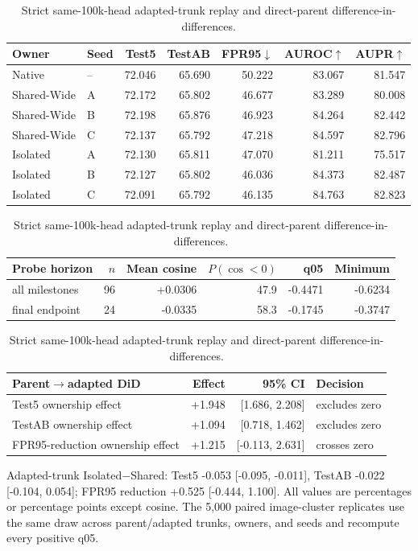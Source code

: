 \begin{table}[t]
\centering
\caption{Strict same-100k-head adapted-trunk replay and direct-parent difference-in-differences.}
\label{tab:supp-same-head-stage-axis}
\scriptsize
\setlength{\tabcolsep}{3.2pt}
\begin{tabular}{llrrrrr}
\toprule
Owner & Seed & Test5 & TestAB & FPR95$\downarrow$ & AUROC$\uparrow$ & AUPR$\uparrow$\\
\midrule
Native & -- & 72.046 & 65.690 & 50.222 & 83.067 & 81.547 \\
Shared-Wide & A & 72.172 & 65.802 & 46.677 & 83.289 & 80.008 \\
Shared-Wide & B & 72.198 & 65.876 & 46.923 & 84.264 & 82.442 \\
Shared-Wide & C & 72.137 & 65.792 & 47.218 & 84.597 & 82.796 \\
Isolated & A & 72.130 & 65.811 & 47.070 & 81.211 & 75.517 \\
Isolated & B & 72.127 & 65.802 & 46.036 & 84.373 & 82.487 \\
Isolated & C & 72.091 & 65.792 & 46.135 & 84.763 & 82.823 \\
\bottomrule
\end{tabular}
\par\smallskip
\begin{tabular}{lrrrrr}
\toprule
Probe horizon & $n$ & Mean cosine & $P(\cos<0)$ & q05 & Minimum\\
\midrule
all milestones & 96 & +0.0306 & 47.9 & -0.4471 & -0.6234 \\
final endpoint & 24 & -0.0335 & 58.3 & -0.1745 & -0.3747 \\
\bottomrule
\end{tabular}
\par\smallskip
\begin{tabular}{lrrl}
\toprule
Parent$\rightarrow$adapted DiD & Effect & 95\% CI & Decision\\
\midrule
Test5 ownership effect & +1.948 & [1.686, 2.208] & excludes zero \\
TestAB ownership effect & +1.094 & [0.718, 1.462] & excludes zero \\
FPR95-reduction ownership effect & +1.215 & [-0.113, 2.631] & crosses zero \\
\bottomrule
\end{tabular}
\parbox{0.98\textwidth}{\scriptsize Adapted-trunk Isolated$-$Shared:
Test5 -0.053 [-0.095, -0.011],
TestAB -0.022 [-0.104, 0.054];
FPR95 reduction +0.525 [-0.444, 1.100].
All values are percentages or percentage points except cosine.  The 5,000
paired image-cluster replicates use the same draw across parent/adapted trunks, owners,
and seeds and recompute every positive q05.}
\end{table}

